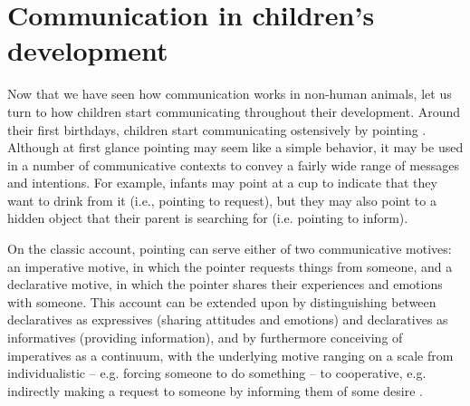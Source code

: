 \section{Communication in children's development}
\label{sec:comm:ontogeny}

Now that we have seen how communication works in non-human animals, let us turn to how children start communicating throughout their development.
Around their first birthdays, children start communicating ostensively by pointing \citep{Tomasello08}.
Although at first glance pointing may seem like a simple behavior, it may be used in a number of communicative contexts to convey a fairly wide range of messages and intentions.
For example, infants may point at a cup to indicate that they want to drink from it (i.e., pointing to request), but they may also point to a hidden object that their parent is searching for (i.e. pointing to inform).

On the classic account, pointing can serve either of two communicative motives: an imperative motive, in which the pointer requests things from someone, and a declarative motive, in which the pointer shares their experiences and emotions with someone.
This account can be extended upon by distinguishing between declaratives as expressives (sharing attitudes and emotions) and declaratives as informatives (providing information), and by furthermore conceiving of imperatives as a continuum, with the underlying motive ranging on a scale from individualistic -- e.g. forcing someone to do something -- to cooperative, e.g. indirectly making a request to someone by informing them of some desire \citep{Tomasello08}.

